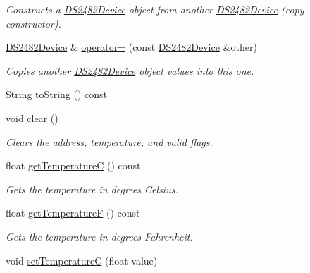 \begin{DoxyCompactItemize}
\begin{DoxyCompactList}\small\item\em Constructs a \mbox{\hyperlink{class_d_s2482_device}{D\+S2482\+Device}} object from another \mbox{\hyperlink{class_d_s2482_device}{D\+S2482\+Device}} (copy constructor). \end{DoxyCompactList}\item 
\mbox{\label{class_d_s2482_device_ab3f97de99e7502b3779df956ad51a330}} 
\mbox{\hyperlink{class_d_s2482_device}{D\+S2482\+Device}} \& \mbox{\hyperlink{class_d_s2482_device_ab3f97de99e7502b3779df956ad51a330}{operator=}} (const \mbox{\hyperlink{class_d_s2482_device}{D\+S2482\+Device}} \&other)
\begin{DoxyCompactList}\small\item\em Copies another \mbox{\hyperlink{class_d_s2482_device}{D\+S2482\+Device}} object values into this one. \end{DoxyCompactList}\item 
String \mbox{\hyperlink{class_d_s2482_device_aba40245ed81c0995c4c2de97ca5de032}{to\+String}} () const
\item 
\mbox{\label{class_d_s2482_device_a2b496358123002cfa29a0f8c08ae10d9}} 
void \mbox{\hyperlink{class_d_s2482_device_a2b496358123002cfa29a0f8c08ae10d9}{clear}} ()
\begin{DoxyCompactList}\small\item\em Clears the address, temperature, and valid flags. \end{DoxyCompactList}\item 
float \mbox{\hyperlink{class_d_s2482_device_a62d317b9ec8b672fbeb8c16fa480ddd7}{get\+TemperatureC}} () const
\begin{DoxyCompactList}\small\item\em Gets the temperature in degrees Celsius. \end{DoxyCompactList}\item 
float \mbox{\hyperlink{class_d_s2482_device_a61ede76341c0c6409ae3faecadbd1545}{get\+TemperatureF}} () const
\begin{DoxyCompactList}\small\item\em Gets the temperature in degrees Fahrenheit. \end{DoxyCompactList}\item 
void \mbox{\hyperlink{class_d_s2482_device_af1891adba72138aa522b258cc6d4026e}{set\+TemperatureC}} (float value)

\end{DoxyCompactItemize}
